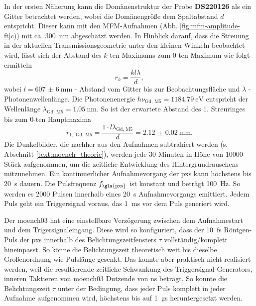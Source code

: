 \noindent
In der ersten Näherung kann die Domänenstruktur der Probe \textbf{DS220126} als ein Gitter betrachtet werden, wobei die Domänengröße dem Spaltabstand $d$ entspricht. Dieser kann mit den MFM-Aufnahmen (Abb. \ref{fig:mfm-amplitude-ft}c)) mit ca. \SI{300}{\nano\meter} abgeschätzt werden. In Hinblick darauf, dass die Streuung in der aktuellen Transmissionsgeometrie unter den kleinen Winkeln beobachtet wird, lässt sich der Abstand des $k$-ten Maximums zum $0$-ten Maximum wie folgt ermitteln
\begin{equation}
     r_{k} = \frac{kl\lambda}{d},
 \end{equation}
 wobei $l = \SI{607(6)}{\milli\meter}$ - Abstand vom Gitter bis zur Beobachtungsfläche und $\lambda$ - Photonenwellenlänge. Die Photonenenergie $h\nu_{\text{Gd, M5}} = \SI{1184,79}{\eV}$ entspricht der Wellenlänge $\lambda_{\text{Gd, M5}} = \SI{1,05}{\nano\meter}$. So ist der erwartete Abstand des 1. Streuringes bis zum $0$-ten Hauptmaxima 
 \begin{equation}
     r_{1, \text{ Gd, M5}} = \frac{1 \cdot l\lambda_{\text{Gd, M5}}}{d} = \SI{2.12(2)}{\milli\meter}.
     \label{eq:theo_r1}
\end{equation}
\noindent
Die Dunkelbilder, die nachher aus den Aufnahmen subtrahiert werden (s. Abschnitt \ref{text:moench_theorie}), werden jede 30 Minuten in Höhe von \num{10000} Stück aufgenommen, um die zeitliche Entwicklung des Hintergrundrauschens mitzunehmen. Ein kontinuierlicher Aufnahmevorgang der \gls{pxs} kann höchstens bis \SI{20}{\second} dauern. Die Pulsfrequenz $f_\text{\gls{pxs}}$ ist konstant und beträgt \SI{100}{\hertz}. So werden es \num{2000} Pulsen innerhalb eines \SI{20}{\second} Aufnahmevorgangs emittiert. Jedem Puls geht ein Triggersignal voraus, das \SI{1}{\milli\second} vor dem Puls generiert wird.

\noindent
Der \gls{moench03} hat eine einstellbare Verzögerung zwischen dem Aufnahmestart und dem Trigersignaleingang. Diese wird so konfiguriert, dass der \SI{10}{\femto\second} Röntgen-Puls der \gls{pxs} innerhalb des Belichtungszeitfensters $\tau$ vollständig/komplett hineinpasst. So könne die Belichtungszeit theoretisch weit bis dieselbe Großenordnung wie Pulslänge gesenkt. Das konnte aber praktisch nicht realisiert werden, weil die resultierende zeitliche Schwankung des Triggersignal-Generators, inneren Taktieren von \gls{moench03} Dutzende von \si{\nano\second} beträgt. So konnte die Belichtungszeit $\tau$ unter der Bedingung, dass jeder Puls komplett in jeder Aufnahme aufgenommen wird, höchstens bis auf \SI{1}{\micro\second} heruntergesetzt werden.

